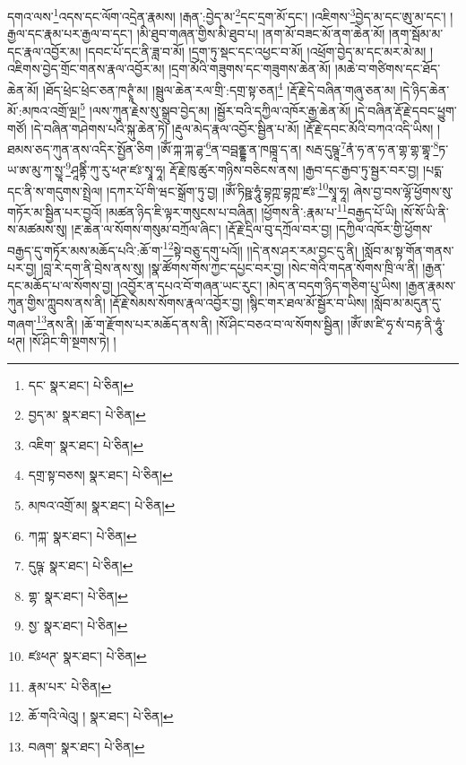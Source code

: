 དགའ་ལས་\footnote{དང་  སྣར་ཐང་།  པེ་ཅིན། }འདས་དང་ལོག་འདྲེན་རྣམས། །རྒན་:བྱེད་མ་\footnote{བྱད་མ་  སྣར་ཐང་།  པེ་ཅིན། }དང་དྲག་མོ་དང་། །འཇིགས་\footnote{འཇིག་  སྣར་ཐང་།  པེ་ཅིན། }བྱེད་མ་དང་ཨུ་མ་དང་། །རྒྱལ་དང་རྣམ་པར་རྒྱལ་བ་དང་། །མི་ཐུབ་གཞན་གྱིས་མི་ཐུབ་པ། །ནག་མོ་བཟང་མོ་ནག་ཆེན་མོ། །ནག་སྦོམ་མ་དང་རྣལ་འབྱོར་མ། །དབང་པོ་དང་ནི་ཟླ་བ་མོ། །དྲག་ཏུ་སྡང་དང་འཕྱང་བ་མོ། །འཕྲོག་བྱེད་མ་དང་མར་མེ་མ། །འཇིགས་བྱེད་གྲོང་གནས་རྣལ་འབྱོར་མ། །དྲག་མོའི་གཟུགས་དང་གཟུགས་ཆེན་མོ། །མཆེ་བ་གཙིགས་དང་ཐོད་ཆེན་མོ། །ཐོད་ཕྲེང་ཕྲེང་ཅན་ཁཊྭཱཾ་མ། །སྦྲུལ་ཆེན་རལ་གྲི་:དགྲ་སྟ་ཅན།\footnote{དགྲ་སྟ་བཅས།  སྣར་ཐང་།  པེ་ཅིན། } །རྡོ་རྗེ་དེ་བཞིན་གཞུ་ཅན་མ། །དེ་ཉིད་ཆེན་མོ་:མཁའ་འགྲོ་ལྔ།\footnote{མཁའ་འགྲོ་མ།  སྣར་ཐང་།  པེ་ཅིན། } །ལས་ཀུན་རྗེས་སུ་སྒྲུབ་བྱེད་མ། །སྦྱོར་བའི་དཀྱིལ་འཁོར་རྒྱ་ཆེན་མོ། །དེ་བཞིན་རྡོ་རྗེ་དབང་ཕྱུག་གཙོ། །དེ་བཞིན་གཤེགས་པའི་སྐུ་ཆེན་ཏེ། །རྡུལ་མེད་རྣལ་འབྱོར་སྦྱིན་པ་མོ། །རྡོ་རྗེ་དབང་མོའི་བཀའ་འདི་ཡིས། །ཐམས་ཅད་ཀུན་ནས་འདིར་སྤྱོན་ཅིག །ཨོཾ་ཀྐ་ཀྐ་ཌྷ་\footnote{ཀཀྐ་  སྣར་ཐང་།  པེ་ཅིན། }ན་བབྦནྡྷ་ན་ཁཁྑཱ་ད་ན། སརྦ་དུཥྚཱ་\footnote{དུཥྚ་  སྣར་ཐང་།  པེ་ཅིན། }ནཾ་ཧ་ན་ཧ་ན་གྷ་གྷ་གྷཱ་\footnote{གྷ་  སྣར་ཐང་།  པེ་ཅིན། }ཏ་ཡ་ཨ་མུ་ཀ་སྱཱ་\footnote{སྱ་  སྣར་ཐང་།  པེ་ཅིན། }ཤཱནྟིཾ་ཀུ་རུ་ཕཊ་ཛཿ་སྭཱ་ཧཱ། རྡོ་རྗེ་ཁུ་ཚུར་གཉིས་བཅིངས་ནས། །རྒྱབ་དང་རྒྱབ་ཏུ་སྦྱར་བར་བྱ། །པདྨ་དང་ནི་ས་གདུགས་སྤྲེལ། །དཀར་པོ་གི་ཝང་སྒྲོག་ཏུ་བྱ། །ཨོཾ་ཏིཥྛ་ཧཱུཾ་བྷཀྵ་བྷཀྵ་ཛཿ་\footnote{ཛཿཕཊ་  སྣར་ཐང་།  པེ་ཅིན། }སྭཱ་ཧཱ། ཞེས་བྱ་བས་ལྷོ་ཕྱོགས་སུ་གཏོར་མ་སྦྱིན་པར་བྱའོ། །མཚན་ཉིད་ཇི་ལྟར་གསུངས་པ་བཞིན། །ཕྱོགས་ནི་:རྣམ་པ་\footnote{རྣམ་པར་  པེ་ཅིན། }བརྒྱད་པོ་ཡི། །སོ་སོ་ཡི་ནི་ས་མཚམས་སུ། །རྔ་ཆེན་ལ་སོགས་གསུམ་བཀྲོལ་ཞིང་། །རྡོ་རྗེ་དྲིལ་བུ་དཀྲོལ་བར་བྱ། །དཀྱིལ་འཁོར་གྱི་ཕྱོགས་བརྒྱད་དུ་གཏོར་མས་མཆོད་པའི་:ཆོ་ག་\footnote{ཆོ་གའི་ལེའུ། །  སྣར་ཐང་།  པེ་ཅིན། }སྟེ་བཅུ་དགུ་པའོ།། །།དེ་ནས་ཤར་རམ་བྱང་དུ་ནི། །སློབ་མ་སྟ་གོན་གནས་པར་བྱ། །བླ་རེ་དག་ནི་བྲེས་ནས་སུ། །སྣ་ཚོགས་གོས་ཀྱང་དཔྱང་བར་བྱ། །སེང་གེའི་གདན་སོགས་ཁྲི་ལ་ནི། །རྒྱན་དང་མཆོད་པ་ལ་སོགས་བྱ། །འབྱོར་ན་དཔའ་བོ་གཞན་ཡང་རུང་། །མེད་ན་བདག་ཉིད་གཅིག་པུ་ཡིས། །རྒྱན་རྣམས་ཀུན་གྱིས་ཀླུབས་ནས་ནི། །རྡོ་རྗེ་སེམས་སོགས་རྣལ་འབྱོར་བྱ། །སྙིང་གར་ཐལ་མོ་སྦྱོར་བ་ཡིས། །སློབ་མ་མདུན་དུ་གཞག་\footnote{བཞག་  སྣར་ཐང་།  པེ་ཅིན། }ནས་ནི། །ཆོ་ག་རྫོགས་པར་མཆོད་ནས་ནི། །སོ་ཤིང་བཅའ་བ་ལ་སོགས་སྦྱིན། །ཨོཾ་ཨ་ཛི་ཧྭ་སཾ་བརྟ་ནི་ཧཱུཾ་ཕཊ། །སོ་ཤིང་གི་སྔགས་ཏེ། །
